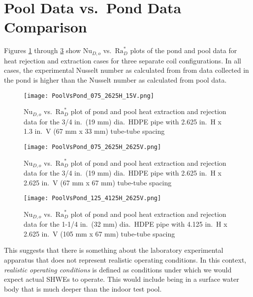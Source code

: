 \section{Pool Data vs.\ Pond Data Comparison}
\label{sec:ExpResult:FinalData}

Figures \ref{fig:ExpResult:FinalData:PoolVsPond_075_2625H_15V} through \ref{fig:ExpResult:FinalData:PoolVsPond_125_4125H_2625V} show $\mbox{Nu}_{D,o}$ vs.\ $\mbox{Ra}_D^*$ plots of the pond and pool data for heat rejection and extraction cases for three separate coil configurations. In all cases, the experimental Nusselt number as calculated from from data collected in the pond is higher than the Nusselt number as calculated from pool data.

	\begin{figure}
		\centering
		\texttt{[image: PoolVsPond\_075\_2625H\_15V.png]}
		\caption[3/4 in.\ (19 mm) dia.\ 2.625 in.\ H x 1.3 in.\ V (67 mm x 33 mm) pool vs.\ pond comparison]{$\mbox{Nu}_{D,o}$ vs.\ $\mbox{Ra}_D^*$ plot of pond and pool heat extraction and rejection data for the 3/4 in.\ (19 mm) dia.\ HDPE pipe with 2.625 in.\ H x 1.3 in.\ V (67 mm x 33 mm) tube-tube spacing}
		\label{fig:ExpResult:FinalData:PoolVsPond_075_2625H_15V}
	\end{figure}
	
	\begin{figure}
		\centering
		\texttt{[image: PoolVsPond\_075\_2625H\_2625V.png]}
		\caption[3/4 in.\ (19 mm) dia.\ 2.625 in.\ H x 2.625 in.\ V (67 mm x 67 mm) pool vs.\ pond comparison]{$\mbox{Nu}_{D,o}$ vs.\ $\mbox{Ra}_D^*$ plot of pond and pool heat extraction and rejection data for the 3/4 in.\ (19 mm) dia.\ HDPE pipe with 2.625 in.\ H x 2.625 in.\ V (67 mm x 67 mm) tube-tube spacing}
		\label{fig:ExpResult:FinalData:PoolVsPond_075_2625H_2625V}
	\end{figure}

	\begin{figure}
		\centering
		\texttt{[image: PoolVsPond\_125\_4125H\_2625V.png]}
		\caption[1-1/4 in.\ (32 mm) dia.\ 4.125 in.\ H x 2.625 in.\ V (105 mm x 67 mm) pool vs.\ pond comparison]{$\mbox{Nu}_{D,o}$ vs.\ $\mbox{Ra}_D^*$ plot of pond and pool heat extraction and rejection data for the 1-1/4 in.\ (32 mm) dia.\ HDPE pipe with 4.125 in.\ H x 2.625 in.\ V (105 mm x 67 mm) tube-tube spacing}
		\label{fig:ExpResult:FinalData:PoolVsPond_125_4125H_2625V}
	\end{figure}

This suggests that there is something about the laboratory experimental apparatus that does not represent realistic operating conditions. In this context, \textit{realistic operating conditions} is defined as conditions under which we would expect actual SHWEs to operate. This would include being in a surface water body that is much deeper than the indoor test pool.

